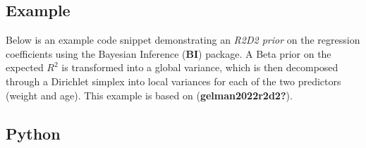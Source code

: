 \documentclass[
  letterpaper,
  DIV=11,
  numbers=noendperiod]{scrartcl}
\begin{document}
\subsection{Example}\label{example}

Below is an example code snippet demonstrating an \emph{R2D2 prior} on
the regression coefficients using the Bayesian Inference (\textbf{BI})
package. A Beta prior on the expected \(R^2\) is transformed into a
global variance, which is then decomposed through a Dirichlet simplex
into local variances for each of the two predictors (weight and age).
This example is based on (\textbf{gelman2022r2d2?}).

\subsection{Python}
\end{document}
